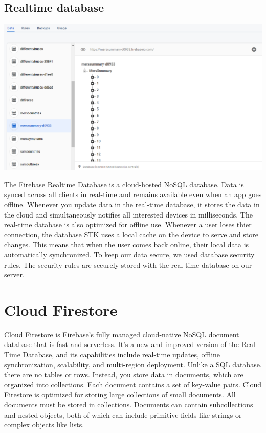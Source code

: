 \subsection{Realtime database}

\begin{center}    
      \includegraphics[scale=0.4]{img/Firebasedb.PNG}
\end{center}

The Firebase Realtime Database is a cloud-hosted NoSQL database.
Data is synced across all clients in real-time and remains available even when an app goes offline.
Whenever you update data in the real-time database, it stores the data in the cloud and simultaneously notifies all interested devices in milliseconds. The real-time database is also optimized for offline use. 
Whenever a user loses thier connection, the database STK uses a local cache on the device to serve and store changes. This means that when the user comes back online, their local data is automatically synchronized. To keep our data secure, we used database security rules.
The security rules are securely stored with the real-time database on our server.


\section{Cloud Firestore}
Cloud Firestore is Firebase's fully managed cloud-native NoSQL document database that is fast and serverless. It's a new and improved version of the Real-Time Database, and its capabilities include real-time updates, offline synchronization, scalability, and multi-region deployment. Unlike a SQL database, there are no tables or rows. Instead, you store data in documents, which are organized into collections. Each document contains a set of key-value pairs. 
Cloud Firestore is optimized for storing large collections of small documents.
All documents must be stored in collections. Documents can contain subcollections and nested objects, both of which can include primitive fields like strings or complex objects like lists.

